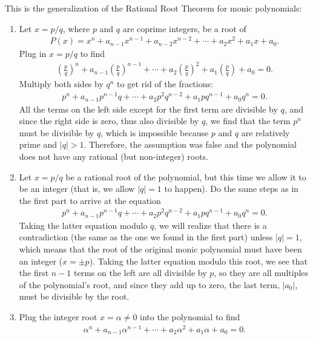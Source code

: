 \documentclass[12pt,a4paper]{memoir}
\theoremstyle{definition}
\begin{document}
	\begin{solution}
		This is the generalization of the Rational Root Theorem for monic polynomials:
		\begin{enumerate}
			\item Let $x=p/q$, where $p$ and $q$ are coprime integers, be a root of 
			\begin{align*}
				P(x)=x^n + a_{n-1}x^{n-1} + a_{n-2}x^{n-2} + \cdots + a_2x^2+a_1x+a_0.
			\end{align*}
			Plug in $x=p/q$ to find
			\begin{align*}
				\left(\frac{p}{q}\right)^n + a_{n-1}\left(\frac{p}{q}\right)^{n-1} + \cdots + a_2\left(\frac{p}{q}\right)^2 + a_1\left(\frac{p}{q}\right) + a_0 = 0.
			\end{align*}
			Multiply both sides by $q^n$ to get rid of the fractions:
			\begin{align*}
				p^n + a_{n-1}p^{n-1}q + \cdots + a_2p^2q^{n-2} + a_1pq^{n-1} + a_0q^n = 0.
			\end{align*}
			All the terms on the left side except for the first term are divisible by $q$, and since the right side is zero, thus also divisible by $q$, we find that the term $p^n$ must be divisible by $q$, which is impossible because $p$ and $q$ are relatively prime and $|q|>1$. Therefore, the assumption was false and the polynomial does not have any rational (but non-integer) roots.
			\item Let $x=p/q$ be a rational root of the polynomial, but this time we allow it to be an integer (that is, we allow $|q|=1$ to happen). Do the same steps as in the first part to arrive at the equation
			\begin{align*}
				p^n + a_{n-1}p^{n-1}q + \cdots + a_2p^2q^{n-2} + a_1pq^{n-1} + a_0q^n = 0.
			\end{align*}
			Taking the latter equation modulo $q$, we will realize that there is a contradiction (the same as the one we found in the first part) unless $|q|=1$, which means that the root of the original monic polynomial must have been an integer ($x=\pm p$). Taking the latter equation modulo this root, we see that the first $n-1$ terms on the left are all divisible by $p$, so they are all multiples of the polynomial's root, and since they add up to zero, the last term, $|a_0|$, must be divisible by the root.
			\item Plug the integer root $x=\alpha \neq 0$ into the polynomial to find
			\begin{align*}
				\alpha^n + a_{n-1}\alpha^{n-1} + \cdots + a_2\alpha^2 + a_1\alpha + a_0 = 0.

\end{align*}
\end{enumerate}
\end{solution}
\end{document}
